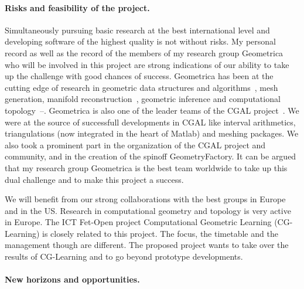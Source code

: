 \paragraph{Risks and feasibility of the project.} 
Simultaneously pursuing basic research at the best international level and developing software of the highest quality is not without risks. %
My personal record as well as the record of the members of my research group Geometrica who will be involved in this project are strong indications of our ability to take up the challenge with good chances of success.  Geometrica has been at the cutting edge of research in geometric data structures and algorithms~\cite{geometrica-ecg-book,by-ag-98}, mesh generation, manifold reconstruction~\cite{geometrica-7142i,geometrica-bgo-09}, geometric inference and computational topology~\cite{geometrica-ccl09}--\cite{geometrica-cseh-07}. Geometrica is also one of the leader teams of the CGAL project~\cite{cgal}.  We were at the source of successfull developments in CGAL like interval arithmetics, triangulations (now integrated in the heart of Matlab) and meshing packages. We also took a prominent part in the organization of the CGAL project and community, and in the creation of the spinoff GeometryFactory. It can be argued that  my research group Geometrica is the best team worldwide to take up this dual challenge and to make this project a success. 


We will benefit from our strong collaborations with the best groups in Europe and in the US.
Research in computational geometry and topology is very active in  Europe.  The ICT Fet-Open project Computational Geometric Learning (CG-Learning) is closely related to this project. The focus, the timetable and the management though are different. The proposed project wants to take over the results of CG-Learning and to go beyond prototype developments.  





\paragraph{New horizons and opportunities.} 



